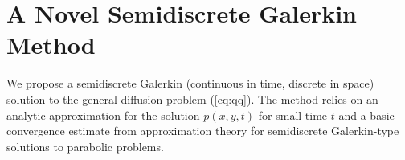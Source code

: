 
\section{A Novel Semidiscrete Galerkin
  Method} \label{sec:semidiscrete-galerkin} We propose a semidiscrete
Galerkin (continuous in time, discrete in space) solution to the
general diffusion problem (\ref{eq:qq}). The method relies on an
analytic approximation for the solution $p(x,y,t)$ for small time $t$
and a basic convergence estimate from approximation theory for
semidiscrete Galerkin-type solutions to parabolic problems.

